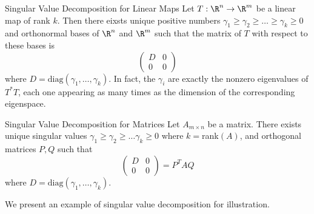 \documentclass[a4paper]{article}
\begin{document}
\begin{thm}{Singular Value Decomposition for Linear Maps}{} Let $T:\R^n\to\R^m$ be a linear map of rank $k$. Then there eixsts unique positive numbers $\gamma_1\geq\gamma_2\geq\dots\geq\gamma_k\geq0$ and orthonormal bases of $\R^n$ and $\R^m$ such that the matrix of $T$ with respect to these bases is $$\begin{pmatrix}
D & 0\\
0 & 0
\end{pmatrix}$$ where $D=\text{diag}(\gamma_1,\dots,\gamma_k)$. In fact, the $\gamma_i$ are exactly the nonzero eigenvalues of $T^*T$, each one appearing as many times as the dimension of the corresponding eigenspace. 
\end{thm}

\begin{thm}{Singular Value Decomposition for Matrices}{} Let $A_{m\times n}$ be a matrix. There exists unique singular values $\gamma_1\geq\gamma_2\geq\dots\gamma_k\geq0$ where $k=$rank$(A)$, and orthogonal matrices $P,Q$ such that $$\begin{pmatrix}
D & 0\\
0 & 0
\end{pmatrix}=P^TAQ$$ where $D=\text{diag}(\gamma_1,\dots,\gamma_k)$. 
\end{thm}

We present an example of singular value decomposition for illustration. 
\end{document}
